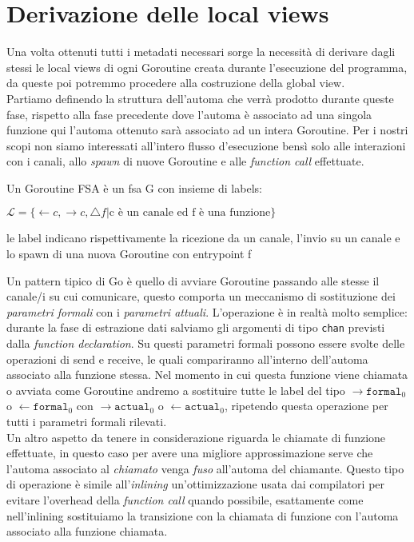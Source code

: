 \section{Derivazione delle local views}
Una volta ottenuti tutti i metadati necessari sorge la necessità di derivare dagli stessi le local views di ogni Goroutine creata durante l'esecuzione del programma, da queste poi potremmo procedere alla costruzione della global view.\bigskip\\
Partiamo definendo la struttura dell'automa che verrà prodotto durante queste fase, rispetto alla fase precedente dove l'automa è associato ad una singola funzione qui l'automa ottenuto sarà associato ad un intera Goroutine. Per i nostri scopi non siamo interessati all'intero flusso d'esecuzione bensì solo alle interazioni con i canali, allo \emph{spawn} di nuove Goroutine e alle \emph{function call} effettuate. \\
\begin{definition}
    Un Goroutine FSA è un fsa G con insieme di labels:
    \begin{center}
        $\mathcal{L} = \{ \leftarrow c, \rightarrow c, \bigtriangleup f | \text{c è un canale ed f è una funzione} \}$
    \end{center}
    le label indicano rispettivamente la ricezione da un canale, l'invio su un canale e lo spawn di una nuova Goroutine con entrypoint f
\end{definition}
Un pattern tipico di Go è quello di avviare Goroutine passando alle stesse il canale/i su cui comunicare, questo comporta un meccanismo di sostituzione dei \emph{parametri formali} con i \emph{parametri attuali}. L'operazione è in realtà molto semplice: durante la fase di estrazione dati salviamo gli argomenti di tipo \texttt{chan} previsti dalla \emph{function declaration}. Su questi parametri formali possono essere svolte delle operazioni di send e receive, le quali compariranno all'interno dell'automa associato alla funzione stessa. Nel momento in cui questa funzione viene chiamata o avviata come Goroutine andremo a sostituire tutte le label del tipo $\rightarrow \texttt{formal}_0$ o $\leftarrow \texttt{formal}_0$ con $\rightarrow \texttt{actual}_0$ o $\leftarrow \texttt{actual}_0$, ripetendo questa operazione per tutti i parametri formali rilevati. \\
Un altro aspetto da tenere in considerazione riguarda le chiamate di funzione effettuate, in questo caso per avere una migliore approssimazione serve che l'automa associato al \emph{chiamato} venga \emph{fuso} all'automa del chiamante. Questo tipo di operazione è simile all'\emph{inlining} un'ottimizzazione usata dai compilatori per evitare l'overhead della \emph{function call} quando possibile, esattamente come nell'inlining sostituiamo la transizione con la chiamata di funzione con l'automa associato alla funzione chiamata.\\
